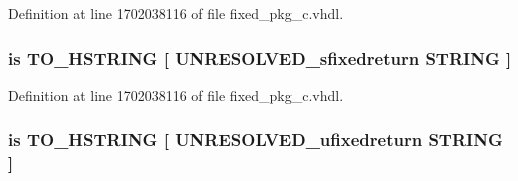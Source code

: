 Definition at line 1702038116 of file fixed\+\_\+pkg\+\_\+c.\+vhdl.

\hypertarget{classfixed__pkg_ac83013dcc205a733ea5c748d96e8f002}{}
\subsubsection[{T\+O\+\_\+\+H\+E\+X\+\_\+\+S\+T\+R\+I\+N\+G}]{ {\bfseries \textcolor{keywordflow}{is}\textcolor{vhdlchar}{ }\textcolor{vhdlchar}{T\+O\+\_\+\+H\+S\+T\+R\+I\+N\+G}\textcolor{vhdlchar}{ }\textcolor{vhdlchar}{\mbox{[}}\textcolor{vhdlchar}{ }\textcolor{vhdlchar}{U\+N\+R\+E\+S\+O\+L\+V\+E\+D\+\_\+sfixedreturn}\textcolor{vhdlchar}{ }\textcolor{comment}{S\+T\+R\+I\+N\+G}\textcolor{vhdlchar}{ }\textcolor{vhdlchar}{\mbox{]}}\textcolor{vhdlchar}{ }} \hspace{0.3cm}{\ttfamily [Alias]}}\label{classfixed__pkg_ac83013dcc205a733ea5c748d96e8f002}


Definition at line 1702038116 of file fixed\+\_\+pkg\+\_\+c.\+vhdl.

\hypertarget{classfixed__pkg_a69dc30f49bfeb6ad2081d18ff834ee92}{}
\subsubsection[{T\+O\+\_\+\+H\+E\+X\+\_\+\+S\+T\+R\+I\+N\+G}]{ {\bfseries \textcolor{keywordflow}{is}\textcolor{vhdlchar}{ }\textcolor{vhdlchar}{T\+O\+\_\+\+H\+S\+T\+R\+I\+N\+G}\textcolor{vhdlchar}{ }\textcolor{vhdlchar}{\mbox{[}}\textcolor{vhdlchar}{ }\textcolor{vhdlchar}{U\+N\+R\+E\+S\+O\+L\+V\+E\+D\+\_\+ufixedreturn}\textcolor{vhdlchar}{ }\textcolor{comment}{S\+T\+R\+I\+N\+G}\textcolor{vhdlchar}{ }\textcolor{vhdlchar}{\mbox{]}}\textcolor{vhdlchar}{ }} \hspace{0.3cm}{\ttfamily [Alias]}}\label{classfixed__pkg_a69dc30f49bfeb6ad2081d18ff834ee92}


